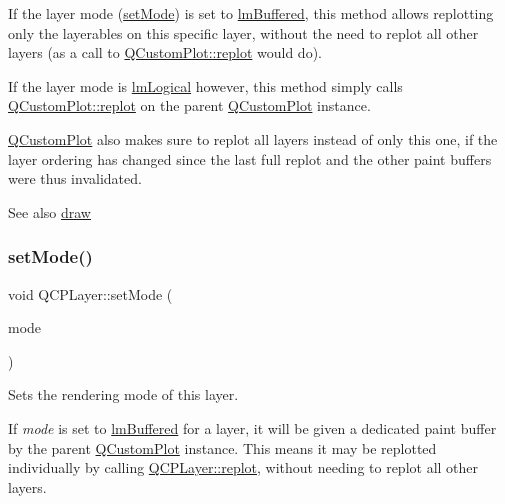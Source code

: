 If the layer mode (\mbox{\hyperlink{class_q_c_p_layer_a938d57b04f4e4c23cedf1711f983919b}{set\+Mode}}) is set to \mbox{\hyperlink{class_q_c_p_layer_a67dcfc1590be2a1f2227c5a39bb59c7cab581b9fab3007c4c65f057f4185d7538}{lm\+Buffered}}, this method allows replotting only the layerables on this specific layer, without the need to replot all other layers (as a call to \mbox{\hyperlink{class_q_custom_plot_aa4bfe7d70dbe67e81d877819b75ab9af}{Q\+Custom\+Plot\+::replot}} would do).

If the layer mode is \mbox{\hyperlink{class_q_c_p_layer_a67dcfc1590be2a1f2227c5a39bb59c7ca02eb5e9a4cb7f1baf1e2b6b99e3b87ce}{lm\+Logical}} however, this method simply calls \mbox{\hyperlink{class_q_custom_plot_aa4bfe7d70dbe67e81d877819b75ab9af}{Q\+Custom\+Plot\+::replot}} on the parent \mbox{\hyperlink{class_q_custom_plot}{Q\+Custom\+Plot}} instance.

\mbox{\hyperlink{class_q_custom_plot}{Q\+Custom\+Plot}} also makes sure to replot all layers instead of only this one, if the layer ordering has changed since the last full replot and the other paint buffers were thus invalidated.

\begin{DoxySeeAlso}{See also}
\mbox{\hyperlink{class_q_c_p_layer_ab831a99c8d30b15ec4533ca341e8813b}{draw}} 
\end{DoxySeeAlso}
\mbox{\label{class_q_c_p_layer_a938d57b04f4e4c23cedf1711f983919b}} 
\subsubsection{\texorpdfstring{setMode()}{setMode()}}
{\footnotesize\ttfamily void Q\+C\+P\+Layer\+::set\+Mode (\begin{DoxyParamCaption}\item[{\mbox{\hyperlink{class_q_c_p_layer_a67dcfc1590be2a1f2227c5a39bb59c7c}{Q\+C\+P\+Layer\+::\+Layer\+Mode}}}]{mode }\end{DoxyParamCaption})}

Sets the rendering mode of this layer.

If {\itshape mode} is set to \mbox{\hyperlink{class_q_c_p_layer_a67dcfc1590be2a1f2227c5a39bb59c7cab581b9fab3007c4c65f057f4185d7538}{lm\+Buffered}} for a layer, it will be given a dedicated paint buffer by the parent \mbox{\hyperlink{class_q_custom_plot}{Q\+Custom\+Plot}} instance. This means it may be replotted individually by calling \mbox{\hyperlink{class_q_c_p_layer_adefd53b6db02f470151c416f42e37180}{Q\+C\+P\+Layer\+::replot}}, without needing to replot all other layers.

